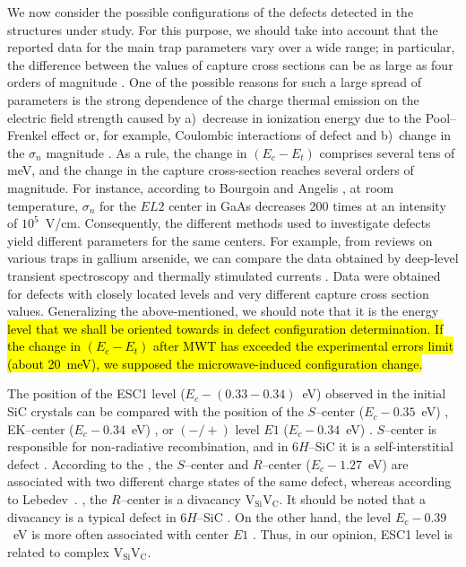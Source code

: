 \documentclass[10pt]{iopart}
\begin{document}
We now consider the possible configurations of the defects detected in the structures under study.
For this purpose, we should take into account that the reported data for the main trap parameters vary over a wide range;
in particular, the difference between the values of capture cross sections can be as large as four orders of magnitude \cite{Pavlovic2000}.
One of the possible reasons for such a large spread of parameters is the strong
dependence of the charge thermal emission on the electric field strength \cite{Bulyarskii2000,Makram} caused by
a)~decrease in ionization energy due to the Pool--Frenkel effect or, for example, Coulombic interactions of defect \cite{Stellmacher} and
b)~change in the $\sigma_n$  magnitude \cite{Bourgoin2001}.
As a rule, the change in $(E_c-E_t)$ comprises several tens of meV, and
the change in the capture cross-section reaches several orders of magnitude.
For instance, according to Bourgoin and Angelis \cite{Bourgoin2001}, at room temperature,
$\sigma_n$  for the $EL2$ center in GaAs decreases 200 times
at an intensity of $10^5$~V/cm.
Consequently, the different methods used to investigate defects yield  different parameters for the same centers.
For example, from reviews on various traps in gallium arsenide,  we can compare the data  obtained by deep-level transient spectroscopy \cite{Bourgoin:GaAs}
and thermally stimulated currents \cite{Pavlovic2000}.
Data were obtained for defects with closely located levels and very different capture cross section values.
Generalizing the above-mentioned, we should note that it is the energy \hl{level that
we shall be oriented towards in defect configuration determination.
If the change in $(E_c-E_t)$ after MWT has exceeded the experimental errors limit (about 20~meV),
we supposed the microwave-induced configuration change.}

The position of the ESC1 level ($E_c-(0.33-0.34)$~eV) observed in the initial SiC crystals can be compared
with the position of the $S$--center ($E_c-0.35$~eV) \cite{Lebed1999En,Anikin1991:2En,Anikin1991:3En},
EK–center ($E_c-0.34$~eV) \cite{Kuznets1997En},
or $(-/+)$ level $E1$ ($E_c-0.34$~eV) \cite{Lebed1999En}.
$S$--center is responsible for non-radiative recombination, and
in 6$H$–SiC it is a self-interstitial defect \cite{Lebed1999En}.
According to the \cite{Anikin1991:2En,Anikin1991:3En},
the $S$--center and $R$--center ($E_c-1.27$~eV) are associated with two different charge states
of the same defect,
whereas according to Lebedev~\etal. \cite{Lebedev2000En},
the $R$--center is a divacancy $\mathrm{V}_\mathrm{Si}\mathrm{V}_\mathrm{C}$.
It should be noted that  a divacancy is a typical defect in 6$H$--SiC \cite{SiCBaran,6HSiC:VV2019}.
On the other hand, the level $E_c-0.39$~eV is more often associated with center $E1$ \cite{SiCWei,SiCKoizumi}.
Thus, in our opinion, ESC1 level is related to complex $\mathrm{V}_\mathrm{Si}\mathrm{V}_\mathrm{C}$.
\end{document}
